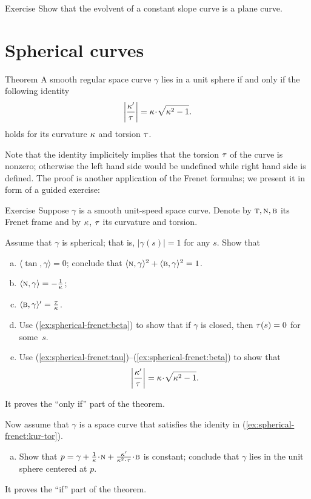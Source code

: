 \begin{thm}{Exercise}\label{ex:evolvent-constant-slope}
Show that the evolvent of a constant slope curve is a plane curve.
\end{thm}

\section{Spherical curves}

\begin{thm}{Theorem}
A smooth regular space curve $\gamma$ lies in a unit sphere if and only if 
the following identity 
\[\left|\frac{\kur'}{\tor}\right|=\kur\cdot\sqrt{\kur^2-1}.\]
holds for its curvature $\kappa$ and torsion $\tau$.
\end{thm}

Note that the identity implicitely implies that the torsion $\tau$ of the curve is nonzero;
otherwise the left hand side would be undefined while right hand side is defined.
The proof is another application of the Frenet formulas;
we present it in form of a guided exercise:

\begin{thm}{Exercise}\label{ex:spherical-frenet}
Suppose $\gamma$ is a smooth unit-speed space curve.
Denote by $\textsc{t},\textsc{n},\textsc{b}$ its Frenet frame and by $\kappa$, $\tau$ its curvature and torsion.

\smallskip

Assume that $\gamma$ is spherical; that is, $|\gamma(s)|=1$ for any $s$.
Show that

\begin{enumerate}[(a)]
\item\label{ex:spherical-frenet:tau} $\langle\tan,\gamma\rangle=0$; conclude that $\langle\textsc{n},\gamma\rangle^2+\langle\textsc{b},\gamma\rangle^2=1$.
\item\label{ex:spherical-frenet:nu} $\langle\textsc{n},\gamma\rangle=-\tfrac1{\kappa}$;
\item\label{ex:spherical-frenet:beta} $\langle\textsc{b},\gamma\rangle'=\tfrac{\tau}{\kappa}$.
\item\label{ex:spherical-frenet:beta+}
Use (\ref{ex:spherical-frenet:beta}) to show that if $\gamma$ is closed, then $\tau(s)=0$ for some~$s$.
\item\label{ex:spherical-frenet:kur-tor} Use (\ref{ex:spherical-frenet:tau})--(\ref{ex:spherical-frenet:beta}) to show that 
\[\left|\frac{\kur'}{\tor}\right|=\kur\cdot\sqrt{\kur^2-1}.\]
\setcounter{lastnumber}{\value{enumi}}
\end{enumerate}
It proves the ``only if'' part of the theorem.

\smallskip

Now assume that $\gamma$ is a space curve that satisfies the idenity in (\ref{ex:spherical-frenet:kur-tor}).
\begin{enumerate}[(a)]
\setcounter{enumi}{\value{lastnumber}}
\item Show that $p=\gamma+\tfrac1\kur\cdot \norm+\tfrac{\kur'}{\kur^2\cdot\tor}\cdot\bi$ is constant; conclude that $\gamma$ lies in the unit sphere centered at $p$.
\end{enumerate}
It proves the ``if'' part of the theorem.
\end{thm}


